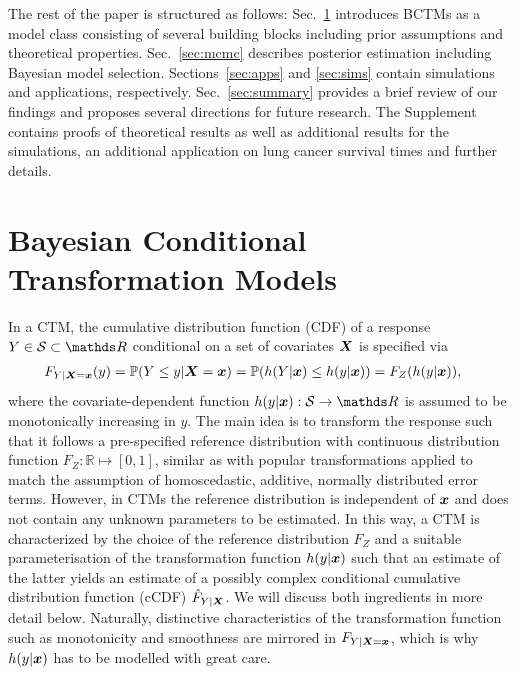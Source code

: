 \documentclass[12pt]{article}
\theoremstyle{plain}
\begin{document}
The rest of the paper is structured as follows: Sec.~\ref{sec:CTM} introduces BCTMs as a model class consisting of several building blocks including prior assumptions and theoretical properties. Sec.~\ref{sec:mcmc} describes posterior estimation including Bayesian model selection. Sections~\ref{sec:apps} and \ref{sec:sims}  contain simulations and applications, respectively. Sec.~\ref{sec:summary} provides a brief review of our findings and proposes several directions for future research. The Supplement contains proofs of theoretical results as well as additional results for the simulations, an additional application on lung cancer survival times and further details.

\section{Bayesian Conditional Transformation Models}\label{sec:CTM}

In a CTM, the cumulative distribution function (CDF) of a response $Y\in\mathcal{S}\subset\dsR$ conditional on a set of covariates $\text{\boldmath$X$}$ is specified via
\begin{align}
F_{Y|\text{\boldmath$X$}={\text{\boldmath$x$}}}(y)=\mathbb{P}(Y \leq y | \text{\boldmath$X$} = \text{\boldmath$x$}) &= \mathbb{P}(h(Y|\text{\boldmath$x$}) \leq h(y|\text{\boldmath$x$}))=  F_Z(h(y|\text{\boldmath$x$})),\label{eq:ctm}
\end{align}
where the covariate-dependent function $h(y|\xvec):\mathcal{S}\to\dsR$ is assumed to be monotonically increasing in $y$. The main idea is to transform the response such that it follows a pre-specified reference distribution with continuous distribution function $F_Z : \mathbb{R} \mapsto [0,1]$, similar as with popular transformations applied to match the assumption of homoscedastic, additive, normally distributed error terms. However, in CTMs the reference distribution is independent of $\text{\boldmath$x$}$ and does not contain any unknown parameters to be estimated. %
In this way, a CTM is  characterized by the choice of the reference distribution $F_Z$ and a suitable parameterisation of the transformation function $h(y|\text{\boldmath$x$})$ such that an estimate of the latter yields an estimate of a possibly complex conditional cumulative distribution function (cCDF) $\hat{F}_{Y|\text{\boldmath$X$}}$. We will discuss both ingredients in more detail below. Naturally, distinctive characteristics of the transformation function such as monotonicity and smoothness are mirrored in $F_{Y|\text{\boldmath$X$} = \text{\boldmath$x$}}$, which is why $h(y|\text{\boldmath$x$})$ has to be modelled with great care.
\end{document}
